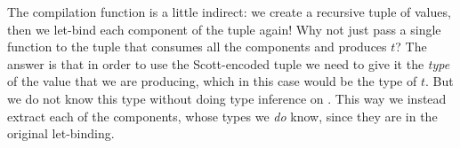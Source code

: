 The compilation function is a little indirect: we create a recursive tuple of
values, then we let-bind each component of the tuple again! Why not just pass a
single function to the tuple that consumes all the components and produces $t$? The answer
is that in order to use the Scott-encoded tuple we need to give it the
\emph{type} of the value that we are producing, which in this case would be the
type of $t$. But we do not know this type without doing type inference
on \FIR{}. This way we instead extract each of the
components, whose types we \emph{do} know, since they are in the original let-binding.
